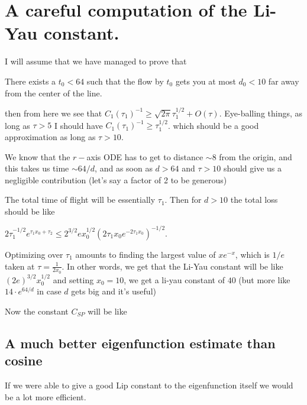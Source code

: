 \section{A careful computation of the Li-Yau constant.}



I will assume that we have managed to prove that

\begin{proposition}
    
There exists a $t_0<64$ such that the flow by $t_0$ gets you at most $d_0<10$ far away from the center of the line.

\end{proposition}

then from here we see that
$C_1(\tau_1)^{-1} \ge \sqrt{2\pi} \tau_1^{1/2}+O(\tau).$
Eye-balling things, as long as $\tau>5$ I should have 
$C_1(\tau_1)^{-1} \ge \tau_1^{1/2}$.
which should be a good approximation as long as $\tau>10$.

We know that the $r-$axis ODE has to get to distance $\sim 8$ from the origin, and this takes us time $\sim 64/d$, and as soon as $d>64$ and $\tau>10$ should give us a negligible contribution (let's say a factor of 2 to be generous)

The total time of flight will be essentially $\tau_1$. Then for $d>10$ the total loss should be like

$2 \tau_1^{-1/2}e^{\tau_1 x_0+\tau_2} \le 2^{3/2} e x_0^{1/2} (2\tau_1x_0e^{-2 \tau_1 x_0})^{-1/2}$.

Optimizing over $\tau_1$ amounts to finding the largest value of $xe^{-x}$, which is $1/e$ taken at $\tau = \frac{1}{2 x_0}$. In other words, we get that the Li-Yau constant will be like $(2e)^{3/2} x_0^{1/2}$ and setting $x_0=10$, we get a li-yau constant of $40$ (but more like $14\cdot e^{64/d}$ in case $d$ gets big and it's useful)

Now the constant $C_{SP}$ will be like 

\subsection{A much better eigenfunction estimate than cosine}

If we were able to give a good Lip constant to the eigenfunction itself we would be a lot more efficient. 